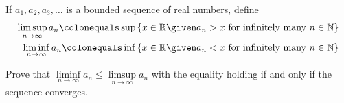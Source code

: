 \begin{problem}
  If $a_1, a_2, a_3, \ldots$ is a bounded sequence of real numbers, define
  \begin{align*}
    \limsup\limits_{n \to \infty}{a_n}
    \colonequals
    \sup \set{x \in \R \given a_n > x \text{ for infinitely many } n \in \N}
    \\
    \liminf\limits_{n \to \infty}{a_n}
    \colonequals
    \inf \set{x \in \R \given a_n < x \text{ for infinitely many } n \in \N}
  \end{align*}

  Prove that $\liminf\limits_{n \to \infty}{a_n} \leq \limsup\limits_{n \to \infty}{a_n}$
  with the equality holding if and only if the sequence converges.
\end{problem}
\begin{answer}
  
\end{answer}
